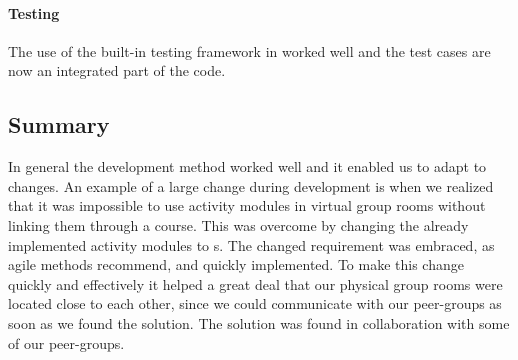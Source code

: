 \paragraph{Testing}
The use of the built-in testing framework in \moodle{} worked well and the test cases are now an integrated part of the code.


\subsection{Summary}
In general the development method worked well and it enabled us to adapt to changes. 
An example of a large change during development is when we realized that it was impossible to use activity modules in virtual group rooms without linking them through a course.
This was overcome by changing the already implemented activity modules to \block[]s. 
The changed requirement was embraced, as agile methods recommend, and quickly implemented.
To make this change quickly and effectively it helped a great deal that our physical group rooms were located close to each other, since we could communicate with our peer-groups as soon as we found the solution.
The solution was found in collaboration with some of our peer-groups.